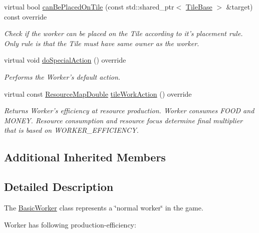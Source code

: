 \begin{DoxyCompactItemize}
virtual bool \hyperlink{classCourse_1_1BasicWorker_ab12d85004e92d9a1e85396d72c6cac98}{can\-Be\-Placed\-On\-Tile} (const std\-::shared\-\_\-ptr$<$ \hyperlink{classCourse_1_1TileBase}{Tile\-Base} $>$ \&target) const override
\begin{DoxyCompactList}\small\item\em Check if the worker can be placed on the Tile according to it's placement rule. Only rule is that the Tile must have same owner as the worker. \end{DoxyCompactList}\item 
virtual void \hyperlink{classCourse_1_1BasicWorker_a626bab94f45602a34631c7ab6e60d829}{do\-Special\-Action} () override
\begin{DoxyCompactList}\small\item\em Performs the Worker's default action. \end{DoxyCompactList}\item 
virtual const \hyperlink{namespaceCourse_a0b96bae1a664dde34efbb1b42dea615e}{Resource\-Map\-Double} \hyperlink{classCourse_1_1BasicWorker_a870cf500ea86d30db583ce64299d9df4}{tile\-Work\-Action} () override
\begin{DoxyCompactList}\small\item\em Returns Worker's efficiency at resource production. Worker consumes F\-O\-O\-D and M\-O\-N\-E\-Y. Resource consumption and resource focus determine final multiplier that is based on W\-O\-R\-K\-E\-R\-\_\-\-E\-F\-F\-I\-C\-I\-E\-N\-C\-Y. \end{DoxyCompactList}\end{DoxyCompactItemize}
\subsection*{Additional Inherited Members}


\subsection{Detailed Description}
The \hyperlink{classCourse_1_1BasicWorker}{Basic\-Worker} class represents a \char`\"{}normal worker\char`\"{} in the game. 

Worker has following production-\/efficiency\-: \par

